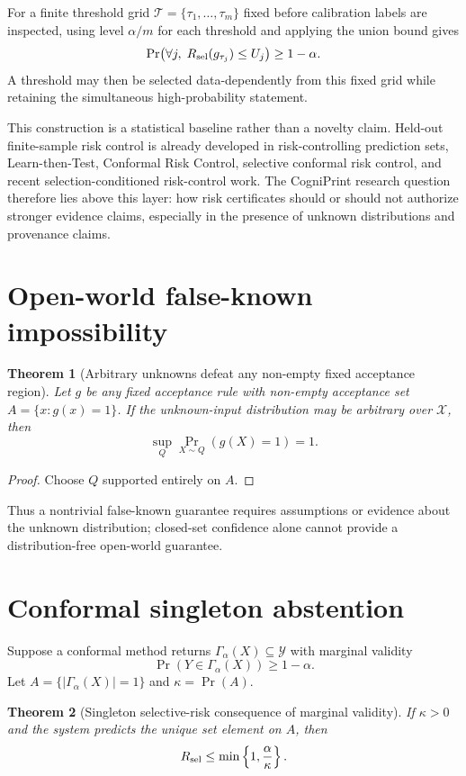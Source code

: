 \documentclass[11pt]{article}
\newtheorem{theorem}{Theorem}
\begin{document}
For a finite threshold grid
$\mathcal T=\{\tau_1,\dots,\tau_m\}$ fixed before calibration labels are
inspected, using level $\alpha/m$ for each threshold and applying the union
bound gives
\[
\Pr\!\left(
\forall j,\;
R_{\rm sel}(g_{\tau_j})\le U_j
\right)
\ge1-\alpha.
\]
A threshold may then be selected data-dependently from this fixed grid while
retaining the simultaneous high-probability statement.

This construction is a statistical baseline rather than a novelty claim.
Held-out finite-sample risk control is already developed in risk-controlling
prediction sets, Learn-then-Test, Conformal Risk Control, selective conformal
risk control, and recent selection-conditioned risk-control work. The
CogniPrint research question therefore lies above this layer: how risk
certificates should or should not authorize stronger evidence claims,
especially in the presence of unknown distributions and provenance claims.

\section{Open-world false-known impossibility}

\begin{theorem}[Arbitrary unknowns defeat any non-empty fixed acceptance region]
Let $g$ be any fixed acceptance rule with non-empty acceptance set
$A=\{x:g(x)=1\}$. If the unknown-input distribution may be arbitrary over
$\mathcal X$, then
\[
\sup_Q \Pr_{X\sim Q}(g(X)=1)=1.
\]
\end{theorem}

\begin{proof}
Choose $Q$ supported entirely on $A$.
\end{proof}

Thus a nontrivial false-known guarantee requires assumptions or evidence about
the unknown distribution; closed-set confidence alone cannot provide a
distribution-free open-world guarantee.

\section{Conformal singleton abstention}

Suppose a conformal method returns
$\Gamma_\alpha(X)\subseteq\mathcal Y$ with marginal validity
\[
\Pr(Y\in\Gamma_\alpha(X))\ge1-\alpha.
\]
Let $A=\{|\Gamma_\alpha(X)|=1\}$ and $\kappa=\Pr(A)$.

\begin{theorem}[Singleton selective-risk consequence of marginal validity]
If $\kappa>0$ and the system predicts the unique set element on $A$, then
\[
R_{\rm sel}\le \min\left\{1,\frac{\alpha}{\kappa}\right\}.
\]
\end{theorem}
\end{document}
